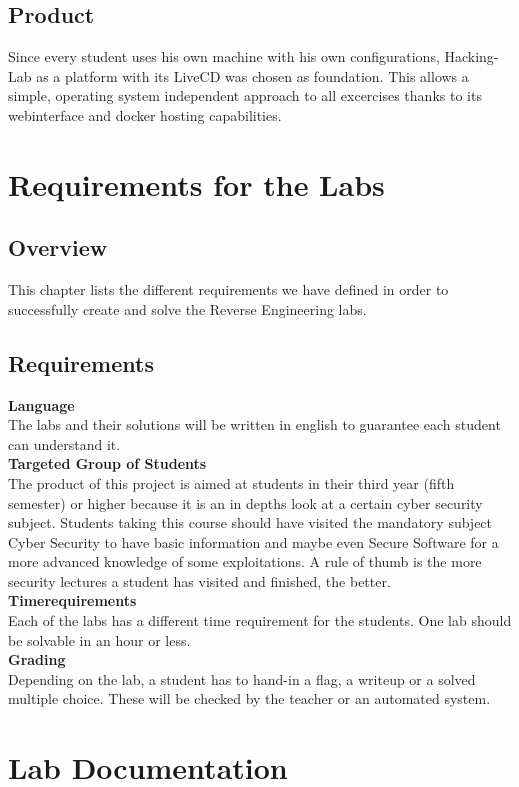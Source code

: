 \subsection{Product}
Since every student uses his own machine with his own configurations, Hacking-Lab as a platform with its LiveCD was chosen as foundation. This allows a simple, operating system independent approach to all excercises thanks to its webinterface and docker hosting capabilities. 

\section{Requirements for the Labs}

\subsection{Overview}
This chapter lists the different requirements we have defined in order to successfully create and solve the Reverse Engineering labs.
\subsection{Requirements}
\textbf{Language} \\
The labs and their solutions will be written in english to guarantee each student can understand it. \\[0.5cm]
\textbf{Targeted Group of Students} \\
The product of this project is aimed at students in their third year (fifth semester) or higher because it is an in depths look at a certain cyber security subject. Students taking this course should have visited the mandatory subject Cyber Security to have basic information and maybe even Secure Software for a more advanced knowledge of some exploitations. A rule of thumb is the more security lectures a student has visited and finished, the better. \\[0.5cm]
\textbf{Timerequirements} \\
Each of the labs has a different time requirement for the students. One lab should be solvable in an hour or less.  \\[0.5cm]
\textbf{Grading} \\
Depending on the lab, a student has to hand-in a flag, a writeup or a solved multiple choice. These will be checked by the teacher or an automated system. \\[0.5cm]

\section{Lab Documentation}

